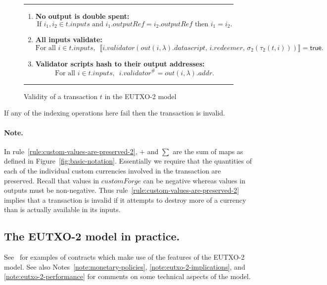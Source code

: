 \documentclass[a4paper]{article}
\newcounter{note}
\newcommand\rfskip{7pt}
\newenvironment{ruledfigure}[1]{\begin{figure}[#1]\hrule\vspace{\rfskip}}{\vspace{\rfskip}\hrule\end{figure}}
\newcommand{\true}{\textsf{true}}
\newcommand{\mi}[1]{\ensuremath{\mathit{#1}}}
\newcommand{\inputs}{\mi{inputs}}
\newcommand{\addr}{\mi{addr}}
\newcommand{\customforge}{\mi{customForge}}
\newcommand{\validator}{\mi{validator}}
\newcommand{\redeemer}{\mi{redeemer}}
\newcommand{\datascript}{\mi{datascript}}
\newcommand{\txout}{\mi{out}}
\begin{document}
\begin{ruledfigure}{H}
\begin{enumerate}
\begin{minipage}{0.85\textwidth}
          \end{minipage}
    \item \label{rule:no-double-spending-2} \textbf{No output is double spent:}
    \[
     \textrm{If } i_1, i_2 \in t.\inputs \textrm{ and }  i_1.\mathit{outputRef} = i_2.\mathit{outputRef}
     \textrm{ then } i_1 = i_2.
    \]
    \item\label{rule:all-inputs-validate-2} \textbf{All inputs validate:}
    \[
    \textrm{For all } i \in t.\inputs,\enspace \llbracket
    i.\validator(\txout(i,\lambda).\datascript,\, i.\redeemer,\, \sigma_2(\tau_2(t, i)))
    \rrbracket = \true.
      \]
    \item\label{rule:validator-scripts-hash-2} \textbf{Validator scripts hash to their output addresses:}
    \[
      \textrm{For all } i \in t.\inputs,\enspace i.\validator^{\#} = \txout(i, \lambda).\addr.
    \]
  \end{enumerate}
  \caption{Validity of a transaction $t$ in the EUTXO-2 model}
  \label{fig:eutxo-2-validity}

\end{ruledfigure}

\noindent If any of the indexing operations here fail then the
transaction is invalid.

\paragraph{Note.} In rule~\ref{rule:custom-values-are-preserved-2},
$+$ and $\sum$ are the sum of maps as defined in
Figure~\ref{fig:basic-notation}. Essentially we require that the
quantities of each of the individual custom currencies involved in the
transaction are preserved.  Recall that values in $\customforge$ can
be negative whereas values in outputs must be non-negative.  Thus
rule~\ref{rule:custom-values-are-preserved-2} implies that a
transaction is invalid if it attempts to destroy more of a currency
than is actually available in its inputs.

\subsection{The EUTXO-2 model in practice.}
See~\cite{Plutus-book} for examples of contracts which make use of the
features of the EUTXO-2 model.  See also
Notes~\ref{note:monetary-policies}, \ref{note:eutxo-2-implications},
and \ref{note:eutxo-2-performance} for comments on some technical
aspects of the model.
\end{document}
